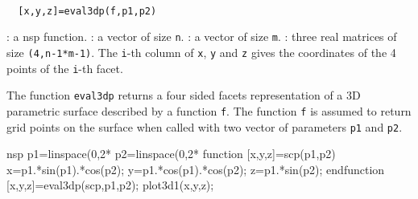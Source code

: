 \begin{mandesc}
  \\
\end{mandesc}
\begin{calling_sequence}
\begin{verbatim}
  [x,y,z]=eval3dp(f,p1,p2)
\end{verbatim}
\end{calling_sequence}
\begin{parameters}
  \begin{varlist}
    :  a nsp function.
    : a vector of size \verb!n!.
    : a vector of size \verb!m!.
    : three real matrices of size \verb!(4,n-1*m-1)!. The \verb!i!-th column
    of \verb!x!, \verb!y! and \verb!z! gives the coordinates of the 4 points of the
    \verb!i!-th facet.
  \end{varlist}
\end{parameters}

\begin{mandescription}
  The function \verb!eval3dp! returns a four sided facets representation of a
  3D parametric surface described by a function \verb!f!. The function \verb!f!
  is assumed to return grid points on the surface when called with two vector of
  parameters \verb!p1! and \verb!p2!.
\end{mandescription}

\begin{examples}
  \begin{mintednsp}{nsp}
    p1=linspace(0,2*%
    p2=linspace(0,2*%
    function [x,y,z]=scp(p1,p2)
      x=p1.*sin(p1).*cos(p2);
      y=p1.*cos(p1).*cos(p2);
      z=p1.*sin(p2);
    endfunction
    [x,y,z]=eval3dp(scp,p1,p2);
    plot3d1(x,y,z);
  \end{mintednsp}
\end{examples}

\begin{manseealso}
   
\end{manseealso}
